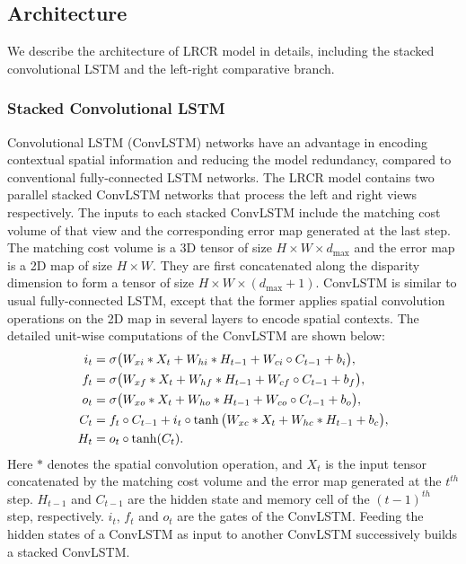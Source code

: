 \documentclass[10pt,twocolumn,letterpaper]{article}
\begin{document}
\subsection{ Architecture}
We describe the architecture of LRCR model in details, including the stacked convolutional LSTM and the left-right comparative branch. 
\vspace{-0.3cm}
\subsubsection{Stacked Convolutional LSTM}
Convolutional LSTM (ConvLSTM) networks have an advantage in encoding contextual spatial information and reducing the model redundancy, compared to  conventional fully-connected LSTM networks. The LRCR model contains two parallel stacked ConvLSTM  networks that process the left and  right views respectively. The inputs to each stacked ConvLSTM include the matching cost volume of that view and the corresponding error map  generated at the last step. The matching cost volume is a 3D tensor of size $H \times W \times d_{\max}$ and the error map is a 2D map of size  $H \times W $. They are first concatenated along the disparity dimension to form a tensor of size $H \times W \times (d_{\max}+1)$. ConvLSTM is similar to  usual fully-connected LSTM, except that the former applies  spatial convolution operations  on the 2D map  in several layers  to encode   spatial contexts. The detailed unit-wise computations of the ConvLSTM are shown below:
\begin{equation}
\vspace{-0cm}
\begin{aligned}
i_{t} &=  \sigma\big(W_{xi}*X_{t}+W_{hi}*H_{t-1}+W_{ci}\circ C_{t-1}+b_{i}\big), \\
f_{t} &=  \sigma\big(W_{xf}*X_{t}+W_{hf}*H_{t-1}+W_{cf}\circ C_{t-1}+b_{f}\big), \\
o_{t} &=  \sigma\big(W_{xo}*X_{t}+W_{ho}*H_{t-1}+W_{co}\circ C_{t-1}+b_{o}\big), \\
C_{t} &=  f_{t}\circ C_{t-1} + i_{t}\circ \tanh\big(W_{xc}*X_{t}+W_{hc}*H_{t-1}+b_{c}\big), \\
H_{t} &=  o_{t}\circ \tanh(C_{t}).
\end{aligned}
\label{eq:eq1}
\vspace{-0cm}
\end{equation}
Here $ * $ denotes the spatial convolution operation, and $X_{t}$ is the input tensor concatenated by the matching cost volume and the error map generated at the $t^{th}$ step. $H_{t-1}$ and $C_{t-1}$ are the hidden state and memory cell of the $(t-1)^{th}$ step, respectively. $i_{t}$, $f_{t}$ and $o_{t}$ are the gates of the ConvLSTM. Feeding the hidden states of a ConvLSTM as  input to another ConvLSTM successively  builds a stacked ConvLSTM. 
\end{document}
